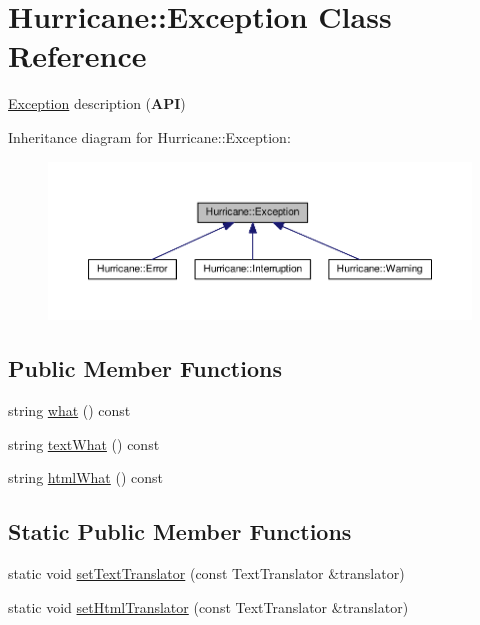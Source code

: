 \hypertarget{classHurricane_1_1Exception}{}\section{Hurricane\+:\+:Exception Class Reference}
\label{classHurricane_1_1Exception}


\mbox{\hyperlink{classHurricane_1_1Exception}{Exception}} description ({\bfseries A\+PI})  




Inheritance diagram for Hurricane\+:\+:Exception\+:\nopagebreak
\begin{figure}[H]
\begin{center}
\leavevmode
\includegraphics[width=350pt]{classHurricane_1_1Exception__inherit__graph}
\end{center}
\end{figure}
\subsection*{Public Member Functions}
\begin{DoxyCompactItemize}
\item 
string \mbox{\hyperlink{classHurricane_1_1Exception_a6d8036af345628567494eeab9c8e2e3a}{what}} () const
\item 
string \mbox{\hyperlink{classHurricane_1_1Exception_a19b5d24e8f02bb99625a5206638c44e8}{text\+What}} () const
\item 
string \mbox{\hyperlink{classHurricane_1_1Exception_a2582e6c3acb236e24f48cb873f64e3e9}{html\+What}} () const
\end{DoxyCompactItemize}
\subsection*{Static Public Member Functions}
\begin{DoxyCompactItemize}
\item 
static void \mbox{\hyperlink{classHurricane_1_1Exception_a1a57fbbc4b57a014558ba31d18ec9b62}{set\+Text\+Translator}} (const Text\+Translator \&translator)
\item 
static void \mbox{\hyperlink{classHurricane_1_1Exception_a0effe808df00f4efe10925131304b8d0}{set\+Html\+Translator}} (const Text\+Translator \&translator)
\end{DoxyCompactItemize}


